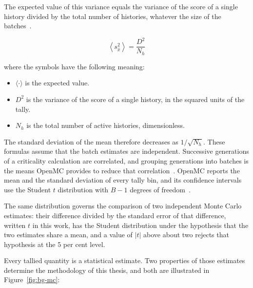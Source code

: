 The expected value of this variance equals the variance of the score of
a single history divided by the total number of histories, whatever the
size of the batches~\cite{lux_koblinger_1991}.

\begin{equation}
\left\langle s_{\hat{x}}^2 \right\rangle = \frac{D^2}{N_h}
\label{eq:mc-var-exp}
\end{equation}

\noindent where the symbols have the following meaning:

\begin{itemize}
  \item $\langle\cdot\rangle$ is the expected value.

  \item $D^2$ is the variance of the score of a single history, in the
        squared units of the tally.

  \item $N_h$ is the total number of active histories, dimensionless.
\end{itemize}

The standard deviation of the mean therefore decreases as $1/\sqrt{N_h}$.
These formulas assume that the batch estimates are independent.
Successive generations of a criticality calculation are correlated, and
grouping generations into batches is the means OpenMC provides to reduce
that correlation~\cite{romano_openmc_2015}. OpenMC reports the mean and
the standard deviation of every tally bin, and its confidence intervals
use the Student $t$ distribution with $B-1$ degrees of
freedom~\cite{openmc_docs}.

The same distribution governs the comparison of two independent Monte
Carlo estimates: their difference divided by the standard error of
that difference, written $t$ in this work, has the Student
distribution under the hypothesis that the two estimates share a mean,
and a value of $|t|$ above about two rejects that hypothesis at the
5 per cent level.

Every tallied quantity is a statistical estimate. Two properties of
those estimates determine the methodology of this thesis, and both are
illustrated in Figure~\ref{fig:bg-mc}:


